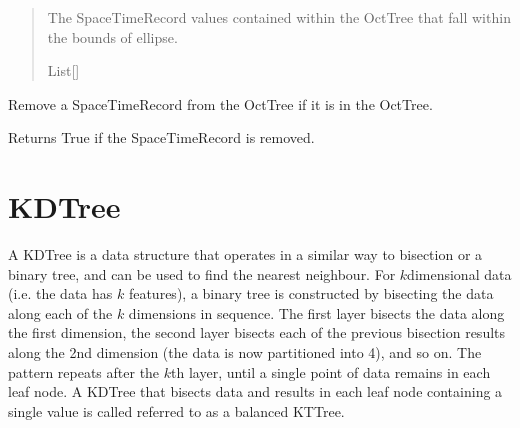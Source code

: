 \documentclass[letterpaper,10pt,english]{sphinxmanual}
\begin{document}
\begin{fulllineitems}
\begin{fulllineitems}
\begin{quote}
\begin{description}
\sphinxAtStartPar
The SpaceTimeRecord values contained within the OctTree that fall
within the bounds of ellipse.

\sphinxAtStartPar
List{[}{\hyperref[\detokenize{record:geotrees.record.SpaceTimeRecord}]{}}{]}

\end{description}\end{quote}

\end{fulllineitems}


\begin{fulllineitems}
\label{\detokenize{octtree:geotrees.octtree.OctTree.remove}}
\pysigstartsignatures
\pysiglinewithargsret
{}
{}
{}
\pysigstopsignatures
\sphinxAtStartPar
Remove a SpaceTimeRecord from the OctTree if it is in the OctTree.

\sphinxAtStartPar
Returns True if the SpaceTimeRecord is removed.
\begin{quote}\begin{description}
\sphinxAtStartPar
{}

\end{description}\end{quote}

\end{fulllineitems}


\end{fulllineitems}


\sphinxstepscope


\chapter{K\sphinxhyphen{}D\sphinxhyphen{}Tree}
\label{\detokenize{kdtree:k-d-tree}}\label{\detokenize{kdtree::doc}}
\sphinxAtStartPar
A K\sphinxhyphen{}D\sphinxhyphen{}Tree is a data structure that operates in a similar way to bisection or a binary tree, and can be used to find the
nearest neighbour. For \(k\)\sphinxhyphen{}dimensional data (i.e. the data has \(k\) features), a binary tree is constructed
by bisecting the data along each of the \(k\) dimensions in sequence. The first layer bisects the data along the
first dimension, the second layer bisects each of the previous bisection results along the 2nd dimension (the data is
now partitioned into 4), and so on. The pattern repeats after the \(k\)\sphinxhyphen{}th layer, until a single point of data
remains in each leaf node. A K\sphinxhyphen{}D\sphinxhyphen{}Tree that bisects data and results in each leaf node containing a single value is
called referred to as a balanced K\sphinxhyphen{}T\sphinxhyphen{}Tree.
\end{document}
